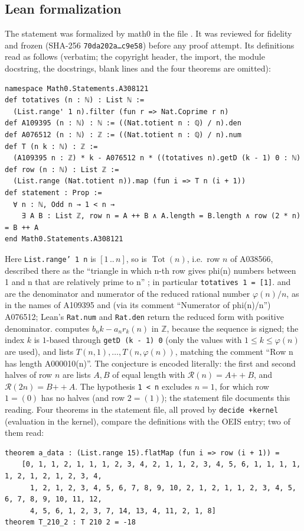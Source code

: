 \documentclass[11pt]{amsart}
\theoremstyle{plain}
\theoremstyle{definition}
\newcommand{\Z}{\mathbb{Z}}
\newcommand{\Tot}{\operatorname{Tot}}
\newcommand{\R}{\mathcal{R}}
\newcommand{\cat}{\mathbin{+\!\!+}}
\newcommand{\iv}[2]{[#1\,..\,#2]}
\begin{document}
\subsection*{Lean formalization}
The statement was formalized by math0 in the file . It was reviewed for fidelity and frozen (SHA-256 \texttt{70da202a\ldots c9e58}) before any proof attempt. Its definitions read as follows (verbatim; the copyright header, the import, the module docstring, the docstrings, blank lines and the four theorems are omitted):
\begin{lstlisting}
namespace Math0.Statements.A308121
def totatives (n : ℕ) : List ℕ :=
  (List.range' 1 n).filter (fun r => Nat.Coprime r n)
def A109395 (n : ℕ) : ℕ := ((Nat.totient n : ℚ) / n).den
def A076512 (n : ℕ) : ℤ := ((Nat.totient n : ℚ) / n).num
def T (n k : ℕ) : ℤ :=
  (A109395 n : ℤ) * k - A076512 n * ((totatives n).getD (k - 1) 0 : ℕ)
def row (n : ℕ) : List ℤ :=
  (List.range (Nat.totient n)).map (fun i => T n (i + 1))
def statement : Prop :=
  ∀ n : ℕ, Odd n → 1 < n →
    ∃ A B : List ℤ, row n = A ++ B ∧ A.length = B.length ∧ row (2 * n) = B ++ A
end Math0.Statements.A308121
\end{lstlisting}
Here \texttt{List.range' 1 n} is $\iv{1}{n}$, so  is $\Tot(n)$, i.e.\ row $n$ of A038566, described there as the ``triangle in which n-th row gives phi(n) numbers between 1 and n that are relatively prime to n'' \cite{A038566}; in particular \texttt{totatives 1 = [1]}.
 and  are the denominator and numerator of the reduced rational number $\varphi(n)/n$, as in the names of A109395 and (via its comment ``Numerator of phi(n)/n'') A076512; Lean's \texttt{Rat.num} and \texttt{Rat.den} return the reduced form with positive denominator.
 computes $b_nk-a_nr_k(n)$ in $\Z$, because the sequence is signed; the index $k$ is $1$-based through \texttt{getD (k - 1) 0} (only the values with $1\le k\le\varphi(n)$ are used), and  lists $T(n,1),\dots,T(n,\varphi(n))$, matching the comment ``Row n has length A000010(n)''.
The conjecture is encoded literally: the first and second halves of row $n$ are lists $A,B$ of equal length with $\R(n)=A\cat B$, and $\R(2n)=B\cat A$.
The hypothesis \texttt{1 < n} excludes $n=1$, for which row $1=(0)$ has no halves (and row $2=(1)$); the statement file documents this reading.
Four theorems in the statement file, all proved by \texttt{decide +kernel} (evaluation in the kernel), compare the definitions with the OEIS entry; two of them read:
\begin{lstlisting}
theorem a_data : (List.range 15).flatMap (fun i => row (i + 1)) =
    [0, 1, 1, 2, 1, 1, 1, 2, 3, 4, 2, 1, 1, 2, 3, 4, 5, 6, 1, 1, 1, 1, 1, 2, 1, 2, 1, 2, 3, 4,
      1, 2, 1, 2, 3, 4, 5, 6, 7, 8, 9, 10, 2, 1, 2, 1, 1, 2, 3, 4, 5, 6, 7, 8, 9, 10, 11, 12,
      4, 5, 6, 1, 2, 3, 7, 14, 13, 4, 11, 2, 1, 8]
theorem T_210_2 : T 210 2 = -18
\end{lstlisting}
\end{document}

